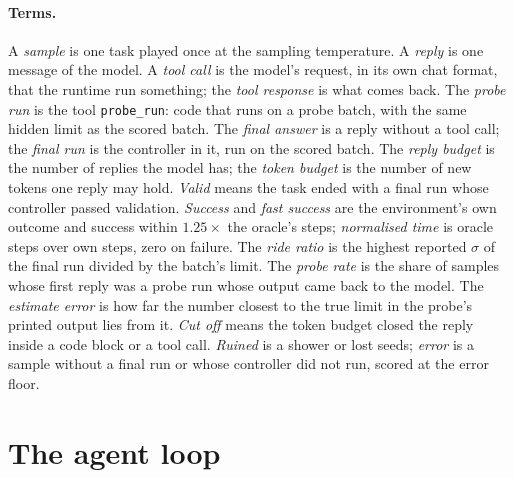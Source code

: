\documentclass[11pt,a4paper]{article}
\begin{document}
\paragraph{Terms.} A \emph{sample} is one task played once at the sampling
temperature. A \emph{reply} is one message of the model. A \emph{tool call}
is the model's request, in its own chat format, that the runtime run
something; the \emph{tool response} is what comes back. The \emph{probe run}
is the tool \texttt{probe\_run}: code that runs on a probe batch, with the
same hidden limit as the scored batch. The \emph{final answer} is a reply
without a tool call; the \emph{final run} is the controller in it, run on the
scored batch. The \emph{reply budget} is the number of replies the model
has; the \emph{token budget} is the number of new tokens one reply may hold.
\emph{Valid} means the task ended with a final run whose controller passed
validation. \emph{Success} and \emph{fast success} are the environment's own
outcome and success within $1.25\times$ the oracle's steps; \emph{normalised
time} is oracle steps over own steps, zero on failure. The \emph{ride ratio}
is the highest reported $\sigma$ of the final run divided by the batch's
limit. The \emph{probe rate} is the share of samples whose first reply was a
probe run whose output came back to the model. The \emph{estimate error} is
how far the number closest to the true limit in the probe's printed output
lies from it. \emph{Cut off} means the token budget closed the reply inside
a code block or a tool call. \emph{Ruined} is a shower or lost seeds;
\emph{error} is a sample without a final run or whose controller did not
run, scored at the error floor.

\section{The agent loop}
\label{sec:loop}
\end{document}
